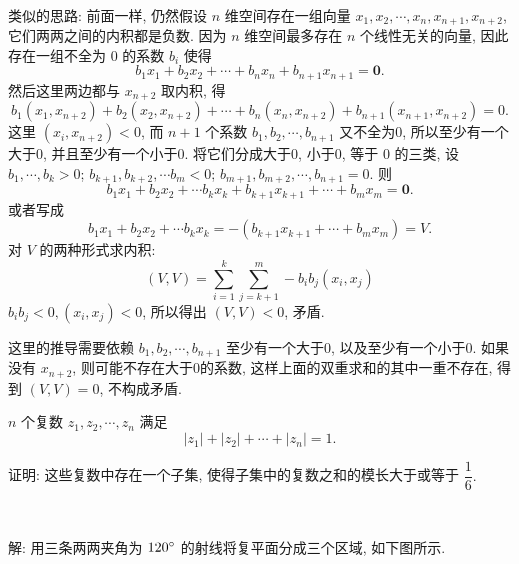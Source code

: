 ~

类似的思路: 前面一样, 仍然假设 $n$ 维空间存在一组向量 $x_1,x_2,\cdots,x_n,x_{n+1},x_{n+2}$, 它们两两之间的内积都是负数. 因为 $n$ 维空间最多存在 $n$ 个线性无关的向量, 因此存在一组不全为 0 的系数 $b_i$ 使得
\[b_1x_1 + b_2x_2 + \cdots + b_nx_n + b_{n+1}x_{n+1}=\mathbf{0}.\]
然后这里两边都与 $x_{n+2}$ 取内积, 得
\[b_1(x_1,x_{n+2}) + b_2(x_2,x_{n+2}) + \cdots + b_n(x_n,x_{n+2}) + b_{n+1}(x_{n+1},x_{n+2}) = 0 .\]
这里 $(x_i,x_{n+2}) < 0$, 而 $n+1$ 个系数 $b_1,b_2,\cdots,b_{n+1}$ 又不全为0, 所以至少有一个大于0, 并且至少有一个小于0. 将它们分成大于0, 小于0, 等于 0 的三类, 设 $b_1,\cdots,b_k > 0$; $b_{k+1},b_{k+2},\cdots b_m < 0$; $b_{m+1},b_{m+2},\cdots,b_{n+1} = 0$. 则
\[b_1x_1 + b_2x_2 + \cdots b_kx_k + b_{k+1}x_{k+1} + \cdots + b_mx_m = \mathbf{0} .\]
或者写成
\[b_1x_1 + b_2x_2 + \cdots b_kx_k = -(b_{k+1}x_{k+1} + \cdots + b_mx_m ) = V.\]
对 $V$ 的两种形式求内积:
\[(V,V) = \sum_{i=1}^k\sum_{j=k+1}^m -b_ib_j(x_i,x_j) \]
$b_ib_j < 0,(x_i,x_j) < 0$, 所以得出 $(V,V) < 0$, 矛盾.

这里的推导需要依赖 $b_1,b_2,\cdots,b_{n+1}$ 至少有一个大于0, 以及至少有一个小于0. 如果没有 $x_{n+2}$, 则可能不存在大于0的系数, 这样上面的双重求和的其中一重不存在, 得到 $(V,V) = 0$, 不构成矛盾.


\newpage
$n$ 个复数 $z_1, z_2, \cdots, z_n$ 满足 
\[ |z_1| + |z_2| + \cdots + |z_n| = 1. \]

证明: 这些复数中存在一个子集, 使得子集中的复数之和的模长大于或等于 $\dfrac{1}{6}.$

~

解: 用三条两两夹角为 $120\degree$ 的射线将复平面分成三个区域, 如下图所示.
\begin{figure*}[htbp]
\centering
{}
\end{figure*}

